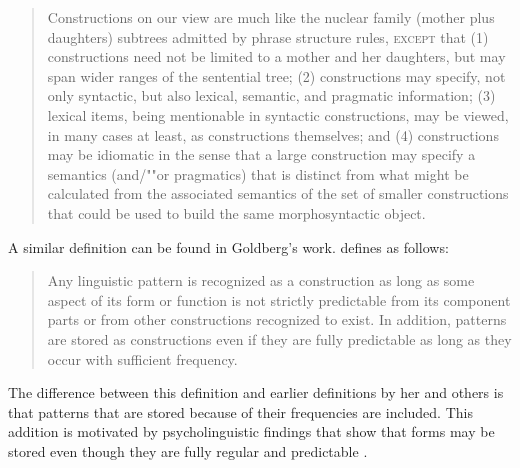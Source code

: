 \documentclass[output=paper
	        ,collection
	        ,collectionchapter
 	        ,biblatex
                ,babelshorthands
                ,newtxmath
                ,draftmode
                ,colorlinks, citecolor=brown
]{langscibook}
\begin{document}
\begin{quote}\label{def-construction-fillmore}
Constructions on our view are much like the nuclear family (mother plus daughters) subtrees
admitted by phrase structure rules, \textsc{except} that (1) constructions need not be limited to a mother
and her daughters, but may span wider ranges of the sentential tree; (2) constructions may specify,
not only syntactic, but also lexical, semantic, and pragmatic information; (3) lexical items,
being mentionable in syntactic constructions, may be viewed, in many cases at least, as
constructions themselves; and (4) constructions may be idiomatic in the sense that a large
construction may specify a semantics (and/""or pragmatics) that is distinct from what might be
calculated from the associated semantics of the set of smaller constructions that could be used to
build the same morphosyntactic object. \citep[]{FKoC88a}
\end{quote}
A similar definition can be found in Goldberg's work. \citet[]{Goldberg2006a} defines  as follows:
\begin{quote}
Any linguistic pattern is recognized as a construction as long as some aspect of its form or
function is not strictly predictable from its component parts or from other constructions recognized
to exist. In addition, patterns are stored as constructions even if they are fully predictable as
long as they occur with sufficient frequency. \citep[]{Goldberg2006a}
\end{quote}
The difference between this definition and earlier definitions by her and others is that patterns
that are stored because of their frequencies are included. This addition is motivated by
psycholinguistic findings that show that forms may be stored even though they are fully regular and
predictable \parencites{Bybee95a-u}[]{PJ2005a}.
%
\end{document}
